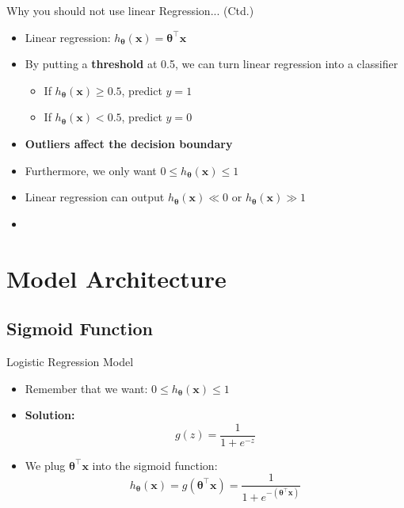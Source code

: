 \begin{frame}{Why you should not use linear Regression... (Ctd.)}{}
	\begin{itemize}
		\item Linear regression: $h_{\bm{\theta}}(\bm{x}) = \bm{\theta}^{\intercal} \bm{x}$
		\item By putting a \textbf{threshold} at 0.5, we can turn linear regression into a classifier
		\begin{itemize}
			\item If $h_{\bm{\theta}}(\bm{x}) \ge 0.5$, predict $y = 1$
			\item If $h_{\bm{\theta}}(\bm{x}) < 0.5$, predict $y = 0$
		\end{itemize}
		\item \textbf{Outliers affect the decision boundary}
		\item Furthermore, we only want $0 \le h_{\bm{\theta}}(\bm{x}) \le 1$
		\item Linear regression can output $h_{\bm{\theta}}(\bm{x}) \ll 0$ or $h_{\bm{\theta}}(\bm{x}) \gg 1$
		\item {}
	\end{itemize}
\end{frame}


\section{Model Architecture}

\subsection{Sigmoid Function}

\begin{frame}{Logistic Regression Model}{}\important
	\begin{itemize}
		\item Remember that we want: $0 \le h_{\bm{\theta}}(\bm{x}) \le 1$
		\item \textbf{Solution:} 
		\begin{equation}
			g(z) = \frac{1}{1 + e^{-z}}
		\end{equation}
		\item We plug $\bm{\theta}^{\intercal} \bm{\bm{x}}$ into the sigmoid function:
		\begin{equation}
			h_{\bm{\theta}}(\bm{x}) = g(\bm{\theta}^{\intercal} \bm{\bm{x}}) = \frac{1}{1 + e^{-(\bm{\theta}^{\intercal} \bm{x})}}
		\end{equation}
	\end{itemize}
\end{frame}


